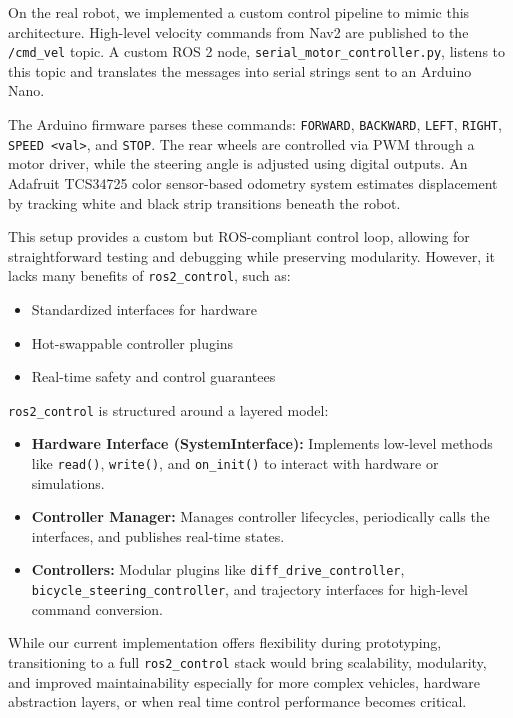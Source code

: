 \documentclass[english,project]{buwthesis}
\begin{document}
On the real robot, we implemented a custom control pipeline to mimic this architecture. High-level velocity commands from Nav2 are published to the \texttt{/cmd\_vel} topic. A custom ROS 2 node, \texttt{serial\_motor\_controller.py}, listens to this topic and translates the messages into serial strings sent to an Arduino Nano.

The Arduino firmware parses these commands:
\texttt{FORWARD}, \texttt{BACKWARD}, \texttt{LEFT}, \texttt{RIGHT}, \texttt{SPEED <val>}, and \texttt{STOP}. The rear wheels are controlled via PWM through a motor driver, while the steering angle is adjusted using digital outputs. An Adafruit TCS34725 color sensor-based odometry system estimates displacement by tracking white and black strip transitions beneath the robot.

This setup provides a custom but ROS-compliant control loop, allowing for straightforward testing and debugging while preserving modularity. However, it lacks many benefits of \texttt{ros2\_control}, such as:

\begin{itemize}
    \item Standardized interfaces for hardware
    \item Hot-swappable controller plugins
    \item Real-time safety and control guarantees
\end{itemize}

\texttt{ros2\_control} is structured around a layered model:

\begin{itemize}
    \item \textbf{Hardware Interface (SystemInterface):} Implements low-level methods like \texttt{read()}, \texttt{write()}, and \texttt{on\_init()} to interact with hardware or simulations.
    \item \textbf{Controller Manager:} Manages controller lifecycles, periodically calls the interfaces, and publishes real-time states.
    \item \textbf{Controllers:} Modular plugins like \texttt{diff\_drive\_controller}, \texttt{bicycle\_steering\_controller}, and trajectory interfaces for high-level command conversion.
\end{itemize}

While our current implementation offers flexibility during prototyping, transitioning to a full \texttt{ros2\_control} stack would bring scalability, modularity, and improved maintainability especially for more complex vehicles, hardware abstraction layers, or when real time control performance becomes critical.
\end{document}
